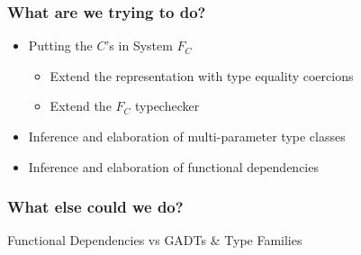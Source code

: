 \documentclass{beamer}
\begin{document}
\begin{frame}
    \frametitle{What are we trying to do?}
    \begin{itemize}
        \item Putting the $C$'s in System $F_C$
            \begin{itemize}
                \item Extend the representation with type equality coercions
                \item Extend the $F_C$ typechecker
            \end{itemize}
        \item Inference and elaboration  of multi-parameter type classes
        \item Inference and elaboration of functional dependencies
    \end{itemize}
\end{frame}

\begin{frame}
    \frametitle{What else could we do?}
    Functional Dependencies vs GADTs $\&$ Type Families
\end{frame}
\end{document}
